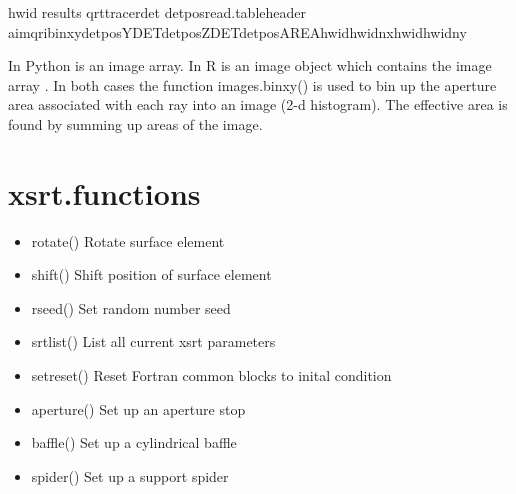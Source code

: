 \documentclass[letterpaper,10pt,english]{sphinxmanual}
\begin{document}
%
\begin{sphinxVerbatim}[commandchars=\\\{\}]
hwid 
results qrt\PYGZus{}tracerdet
detposread.tableheader
aimqri\PYGZus{}binxydetposYDETdetposZDETdetposAREAhwidhwidnxhwidhwidny
\end{sphinxVerbatim}

In Python  is an image array. In R  is an image object which
contains the image array .
In both cases the function images.binxy() is used to bin up the aperture area
associated with each ray into an image (2-d histogram). The effective area
is found by summing up areas of the image.


\section{xsrt.functions}
\label{\detokenize{xsrt_functions:xsrt-functions}}\label{\detokenize{xsrt_functions::doc}}
\begin{itemize}
\item {} 
rotate() Rotate surface element

\item {} 
shift() Shift position of surface element

\item {} 
rseed() Set random number seed

\item {} 
srtlist() List all current xsrt parameters

\item {} 
setreset() Reset Fortran common blocks to inital condition

\end{itemize}

\begin{itemize}
\item {} 
aperture() Set up an aperture stop

\item {} 
baffle() Set up a cylindrical baffle

\item {} 
spider() Set up a support spider

\end{itemize}
\end{document}
